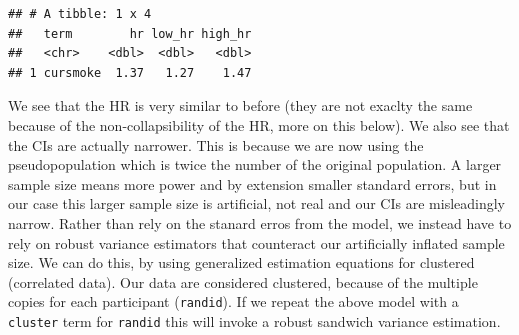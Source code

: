 \documentclass[
]{book}
\newenvironment{Shaded}{\begin{snugshade}}{\end{snugshade}}
\newcommand{\DataTypeTok}[1]{\textcolor[rgb]{0.13,0.29,0.53}{#1}}
\newcommand{\FloatTok}[1]{\textcolor[rgb]{0.00,0.00,0.81}{#1}}
\newcommand{\KeywordTok}[1]{\textcolor[rgb]{0.13,0.29,0.53}{\textbf{#1}}}
\newcommand{\NormalTok}[1]{#1}
\newcommand{\OperatorTok}[1]{\textcolor[rgb]{0.81,0.36,0.00}{\textbf{#1}}}
\newcommand{\StringTok}[1]{\textcolor[rgb]{0.31,0.60,0.02}{#1}}
\begin{document}
\begin{Shaded}
\end{Shaded}

\begin{verbatim}
## # A tibble: 1 x 4
##   term        hr low_hr high_hr
##   <chr>    <dbl>  <dbl>   <dbl>
## 1 cursmoke  1.37   1.27    1.47
\end{verbatim}

We see that the HR is very similar to before (they are not exaclty the same because of the non-collapsibility of the HR, more on this below). We also see that the CIs are actually narrower. This is because we are now using the pseudopopulation which is twice the number of the original population. A larger sample size means more power and by extension smaller standard errors, but in our case this larger sample size is artificial, not real and our CIs are misleadingly narrow. Rather than rely on the stanard erros from the model, we instead have to rely on robust variance estimators that counteract our artificially inflated sample size. We can do this, by using generalized estimation equations for clustered (correlated data). Our data are considered clustered, because of the multiple copies for each participant (\texttt{randid}). If we repeat the above model with a \texttt{cluster} term for \texttt{randid} this will invoke a robust sandwich variance estimation.
\end{document}
